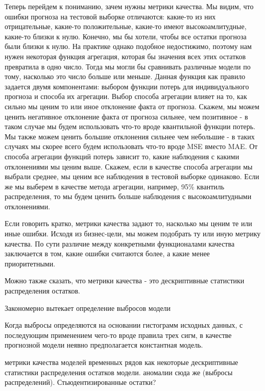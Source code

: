 Теперь перейдем к пониманию, зачем нужны метрики качества. Мы видим,
что ошибки прогноза на тестовой выборке отличаются: какие-то из них
отрицательные, какие-то положительные, какие-то имеют
высокоамлитудные, какие-то близки к нулю. Конечно, мы бы хотели,
чтобы все остатки прогноза были близки к нулю. На практике однако
подобное недостижимо, поэтому нам нужен некоторая функция агрегация,
которая бы значения всех этих остатков превратила в одно число. Тогда
мы могли бы сравнивать различные модели по тому, насколько это число
больше или меньше. Данная функция как правило задается двумя
компонентами: выбором функции потерь для индивидуального прогноза и
способа их агрегации. Выбор способа агрегации влияет на то, как
сильно мы ценим то или иное отклонение факта от прогноза. Скажем, мы
можем ценить негативное отклонение факта от прогноза сильнее, чем
позитивное - в таком случае мы будем использовать что-то вроде
квантильной функции потерь. Мы также можем ценить большие отклонения
сильнее чем небольшие - в таких случаях мы скорее всего будем
использовать что-то вроде MSE вместо MAE. От способа агрегации
функций потерь зависит то, какие наблюдения с какими отклонениями мы
ценим выше. Скажем, если в качестве способа агрегации мы выбрали
среднее, мы ценим все наблюдения в тестовой выборке одинаково. Если
же мы выберем в качестве метода агрегации, например, 95\% квантиль
распределения, то мы будем ценить больше наблюдения с
высокоамлитудными отклонениями.

Если говорить кратко, метрики качества задают то, насколько мы ценим
те или иные ошибки. Исходя из бизнес-цели, мы можем подобрать ту или
иную метрику качества. По сути различие между конкретными
функционалами качества заключается
в том, какие ошибки считаются более, а какие менее приоритетными.

Можно также сказать, что метрики качества - это дескриптивные
статистики распределения остатков.


Закономерно вытекает определение выбросов модели


Когда выбросы определяются на основании гистограмм исходных данных, с
последующим применением чего-то вроде правила трех сигм, в качестве
прогнозной модели неявно предполагается константная модель.

метрики качества моделей
временных рядов как некоторые дескриптивные статистики распределения
остатков модели. аномалии сюда же (выбросы распределений).
Стьюдентизированные остатки?


